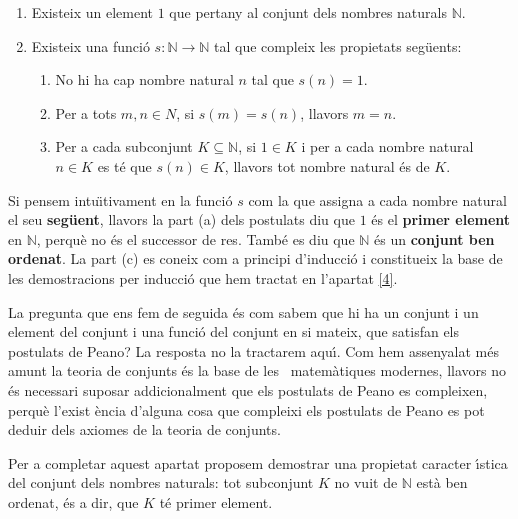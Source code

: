 \begin{enumerate}
\item Existeix un element $1$ que pertany al conjunt dels nombres naturals $%
\mathbb{N}$.

\item Existeix una funci\'{o} $s:\mathbb{N}\longrightarrow\mathbb{N}$ tal
que compleix les propietats seg\"{u}ents:

\begin{enumerate}
\item No hi ha cap nombre natural $n$ tal que $s(n)=1.$

\item Per a tots $m,n\in N$, si $s(m)=s(n)$, llavors $m=n$.

\item Per a cada subconjunt $K\subseteq\mathbb{N}$, si $1\in K$ i per a cada
nombre natural $n\in K$ es t\'{e} que $s(n)\in K$, llavors tot nombre
natural \'{e}s de $K$.
\end{enumerate}
\end{enumerate}

Si pensem intu\"{\i}tivament en la funci\'{o} $s$ com la que assigna a cada
nombre natural el seu \textbf{seg\"{u}ent}, llavors la part (a) dels
postulats diu que $1$ \'{e}s el \textbf{primer element} en $\mathbb{N}$,
perqu\`{e} no \'{e}s el successor de res. Tamb\'{e} es diu que $\mathbb{N}$
\'{e}s un \textbf{conjunt ben ordenat}. La part (c) es coneix com a principi
d'inducci\'{o} i constitueix la base de les demostracions per inducci\'{o}
que hem tractat en l'apartat \ref{4}.

\bigskip

La pregunta que ens fem de seguida \'{e}s com sabem que hi ha un conjunt i
un element del conjunt i una funci\'{o} del conjunt en si mateix, que
satisfan els postulats de Peano? La resposta no la tractarem aqu\'{\i}. Com
hem assenyalat m\'{e}s amunt la teoria de conjunts \'{e}s la base de les \
matem\`{a}tiques modernes, llavors no \'{e}s necessari suposar
addicionalment que els postulats de Peano es compleixen, perqu\`{e} l'exist%
\`{e}ncia d'alguna cosa que compleixi els postulats de Peano es pot deduir
dels axiomes de la teoria de conjunts.

\bigskip

Per a completar aquest apartat proposem demostrar una propietat caracter%
\'{\i}stica del conjunt dels nombres naturals: tot subconjunt $K$ no vuit de
$\mathbb{N}$ est\`{a} ben ordenat, \'{e}s a dir, que $K$ t\'{e} primer
element.

